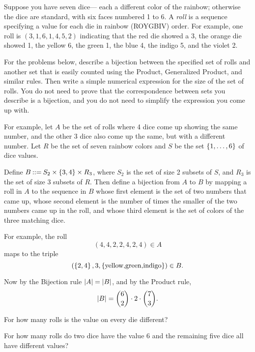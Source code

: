 \documentclass[11pt,twoside]{article}
\begin{document}


\begin{problem}
Suppose you have seven dice--- each a different color of the rainbow;
otherwise the dice are standard, with six faces numbered 1 to 6.  A
\emph{roll} is a sequence specifying a value for each die in rainbow
(ROYGBIV) order.  For example, one roll is $(3,1,6,1,4,5,2)$ indicating
that the red die showed a 3, the orange die showed 1, the yellow 6, the
green 1, the blue 4, the indigo 5, and the violet 2.

For the problems below, describe a bijection between the specified set of
rolls and another set that is easily counted using the Product,
Generalized Product, and similar rules.  Then write a simple numerical
expression for the size of the set of rolls.  You do not need to prove
that the correspondence between sets you describe is a bijection, and you
do not need to simplify the expression you come up with.

For example, let $A$ be the set of rolls where 4 dice come up showing the
same number, and the other 3 dice also come up the same, but with a
different number.  Let $R$ be the set of seven rainbow colors and $S$
be the set $\left\{1,\dots,6\right\}$ of dice values.

Define $B \mathbin{::=} S_2 \times \left\{3,4\right\} \times R_3$, where $S_2$ is the set
of size 2 subsets of $S$, and $R_3$ is the set of size 3 subsets of $R$.
Then define a bijection from $A$ to $B$ by mapping a roll in $A$ to the
sequence in $B$ whose first element is the set of two numbers that came
up, whose second element is the number of times the smaller of the two
numbers came up in the roll, and whose third element is the set of colors
of the three matching dice.

For example, the roll
\[
(4,4,2,2,4,2,4) \in A
\]
maps to the triple
\[
(\left\{2,4\right\},3,\left\{\text{yellow,green,indigo}\right\}) \in B.
\]

Now by the Bijection rule $\left|A\right| = \left|B\right|$, and by the Product rule,
\[
\left|B\right| = \binom{6}{2} \cdot 2 \cdot \binom{7}{3}.
\]

\bparts

\ppart For how many rolls is the value on every die different?


\ppart\label{66} For how many rolls do two dice have the value 6 and the
remaining five dice all have different values?


\end{problem}
\end{document}
